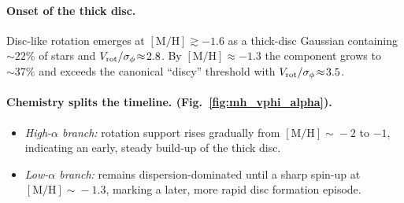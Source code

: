 \documentclass[a4paper,10pt]{article}
\begin{document}
\begin{multicols}{2}
\paragraph{Onset of the thick disc.}
Disc-like rotation emerges at $\mathrm{[M/H]}\gtrsim-1.6$ as a thick-disc
Gaussian containing $\sim22\%$ of stars and
$V_{\rm rot}/\sigma_\phi\!\approx\!2.8$.  By
$\mathrm{[M/H]}\approx-1.3$ the component grows to $\sim37\%$ and exceeds the
canonical “discy” threshold with $V_{\rm rot}/\sigma_\phi\!\approx\!3.5$.



\paragraph{Chemistry splits the timeline. (Fig.~\ref{fig:mh_vphi_alpha}).}
\begin{itemize}
  \item \textit{High-$\alpha$ branch:} rotation support rises gradually from
        $\mathrm{[M/H]}\!\sim\!-2$ to $-1$, indicating an early, steady build-up
        of the thick disc.
  \item \textit{Low-$\alpha$ branch:} remains dispersion-dominated until a
        sharp spin-up at $\mathrm{[M/H]}\!\sim\!-1.3$, marking a later, more
        rapid disc formation episode.
\end{itemize}


\end{multicols}
\end{document}

